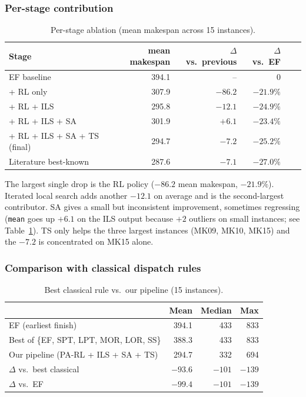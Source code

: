 \documentclass[10pt]{article}
\theoremstyle{definition}
\begin{document}
\subsubsection{Per-stage contribution}

\begin{table}[h]
\centering
\caption{Per-stage ablation (mean makespan across 15 instances).}
\label{tab:per-stage}
\small
\begin{tabular}{lrrrrr}
\toprule
Stage & mean makespan & $\Delta$ vs.\ previous & $\Delta$ vs.\ EF \\
\midrule
EF baseline & 394.1 & -- & 0 \\
+ RL only & 307.9 & $-86.2$ & $-21.9\%$ \\
+ RL + ILS & 295.8 & $-12.1$ & $-24.9\%$ \\
+ RL + ILS + SA & 301.9 & $+6.1$ & $-23.4\%$ \\
+ RL + ILS + SA + TS (final) & 294.7 & $-7.2$ & $-25.2\%$ \\
\midrule
Literature best-known & 287.6 & $-7.1$ & $-27.0\%$ \\
\bottomrule
\end{tabular}
\end{table}

The largest single drop is the RL policy ($-86.2$ mean
makespan, $-21.9\%$). Iterated local search adds another $-12.1$
on average and is the second-largest contributor. SA gives a
small but inconsistent improvement, sometimes regressing
(\texttt{mean} goes up $+6.1$ on the ILS output because
$+2$ outliers on small instances; see
Table~\ref{tab:per-stage}). TS only helps the three largest
instances (MK09, MK10, MK15) and the $-7.2$ is concentrated on
MK15 alone.

\subsubsection{Comparison with classical dispatch rules}

\begin{table}[h]
\centering
\caption{Best classical rule vs.\ our pipeline (15 instances).}
\label{tab:classical}
\small
\begin{tabular}{lrrr}
\toprule
& \textbf{Mean} & \textbf{Median} & \textbf{Max} \\
\midrule
EF (earliest finish) & 394.1 & 433 & 833 \\
Best of \{EF, SPT, LPT, MOR, LOR, SS\} & 388.3 & 433 & 833 \\
Our pipeline (PA-RL + ILS + SA + TS) & 294.7 & 332 & 694 \\
\midrule
$\Delta$ vs.\ best classical & $-93.6$ & $-101$ & $-139$ \\
$\Delta$ vs.\ EF & $-99.4$ & $-101$ & $-139$ \\
\bottomrule
\end{tabular}
\end{table}
\end{document}
